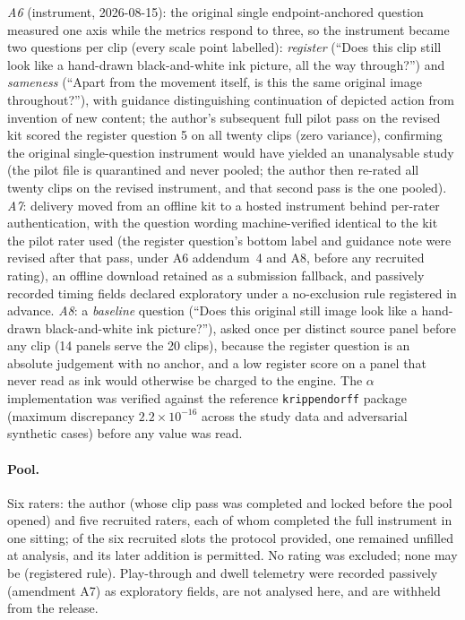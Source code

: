 \documentclass[11pt]{article}
\begin{document}
\emph{A6} (instrument, 2026-08-15): the original single endpoint-anchored
question measured one axis while the metrics respond to three, so the
instrument became two questions per clip (every scale point labelled): \emph{register} (``Does this clip still look like a hand-drawn
black-and-white ink picture, all the way through?'') and \emph{sameness}
(``Apart from the movement itself, is this the same original image
throughout?''), with guidance distinguishing continuation of depicted action
from invention of new content; the author's subsequent full pilot pass on the
revised kit scored the register question 5 on all twenty clips (zero
variance), confirming the original single-question instrument would have
yielded an unanalysable study (the pilot file is quarantined and never
pooled; the author then re-rated all twenty clips on the revised instrument,
and that second pass is the one pooled). \emph{A7}: delivery moved from an offline kit
to a hosted instrument behind per-rater authentication, with the question
wording machine-verified identical to the kit the pilot rater used (the
register question's bottom label and guidance note were revised after that
pass, under A6 addendum~4 and A8, before any recruited rating), an
offline download retained as a submission fallback, and passively recorded
timing fields declared exploratory under a no-exclusion rule registered in
advance. \emph{A8}: a \emph{baseline} question (``Does this original still image look
like a hand-drawn black-and-white ink picture?''), asked once per distinct
source panel before any clip (14 panels serve the 20 clips), because the register question is an absolute judgement with no
anchor, and a low register score on a panel that never read as ink would
otherwise be charged to the engine. The $\alpha$ implementation was verified
against the reference \texttt{krippendorff} package (maximum discrepancy
$2.2\times10^{-16}$ across the study data and adversarial synthetic cases)
before any value was read.

\paragraph{Pool.} Six raters: the author (whose clip pass was completed and
locked before the pool opened) and five recruited raters, each of whom completed the
full instrument in one sitting; of the six recruited slots the protocol
provided, one remained unfilled at analysis, and its later addition is
permitted. No rating was
excluded; none may be (registered rule). Play-through and dwell telemetry
were recorded passively (amendment A7) as exploratory fields, are not analysed here,
and are withheld from the release.
\end{document}
